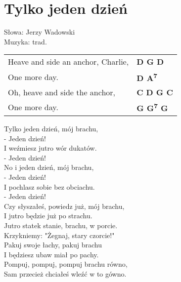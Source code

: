 \section{Tylko jeden dzień}

Słowa: Jerzy Wadowski\\
Muzyka:  trad.

\vspace{2em}
\begin{tabular}{@{}p{7cm}@{}l@{}}
Heave and side an anchor, Charlie, & \bfseries  D G D \\
One more day. & \bfseries  D A\textsuperscript{7} \\
Oh, heave and side the anchor, & \bfseries  C D G C \\
One more day. & \bfseries  G G\textsuperscript{7} G \\
\end{tabular}

\vspace{1em}
Tylko jeden dzień, mój brachu, \\
- Jeden dzień! \\
I weźmiesz jutro wór dukatów. \\
- Jeden dzień! \\

No i jeden dzień, mój brachu, \\
- Jeden dzień! \\
I pochlasz sobie bez obciachu. \\
- Jeden dzień! \\

Czy słyszałeś, powiedz już, mój brachu, \\
I jutro będzie już po strachu. \\
Jutro statek stanie, brachu, w porcie. \\
Krzykniemy: "Żegnaj, stary czorcie!" \\

Pakuj swoje łachy, pakuj brachu \\
I będziesz ubaw miał po pachy. \\
Pompuj, pompuj, pompuj brachu równo, \\
Sam przecież chciałeś wleźć w to gówno.